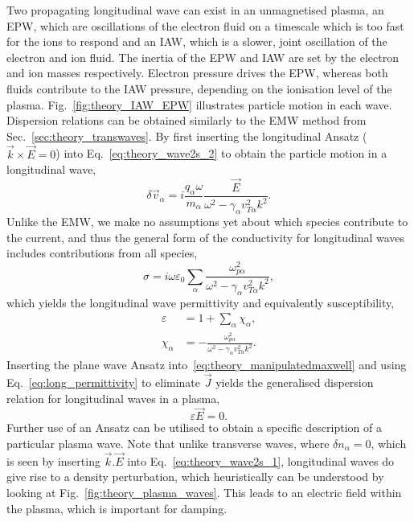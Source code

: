 Two propagating longitudinal wave can exist in an unmagnetised plasma, an \ac{EPW}, which are oscillations of the electron fluid on a timescale which is too fast for the ions to respond and an \ac{IAW}, which is a slower, joint oscillation of the electron and ion fluid.
The inertia of the \ac{EPW} and \ac{IAW} are set by the electron and ion masses respectively.
Electron pressure drives the \ac{EPW}, whereas both fluids contribute to the \ac{IAW} pressure, depending on the ionisation level of the plasma.
Fig.~\ref{fig:theory_IAW_EPW} illustrates particle motion in each wave.
Dispersion relations can be obtained similarly to the \ac{EMW} method from Sec.~\ref{sec:theory_transwaves}.
By first inserting the longitudinal Ansatz ($\vec{k}\times\vec{E}=0$) into Eq.~\ref{eq:theory_wave2s_2} to obtain the particle motion in a longitudinal wave,
\begin{equation}
    \delta \vec{v}_\alpha = i \frac{q_\alpha \omega}{m_\alpha} \frac{\vec{E}}{\omega^2 - \gamma_\alpha v_{T\alpha}^2 k^2}.
\end{equation}
Unlike the \ac{EMW}, we make no assumptions yet about which species contribute to the current, and thus the general form of the conductivity for longitudinal waves includes contributions from all species,
\begin{equation}
    \sigma = i\omega\varepsilon_0 \sum_{\alpha} \frac{\omega_{p\alpha}^2}{\omega^2 - \gamma_\alpha v_{T\alpha}^2 k^2},
\end{equation}
which yields the longitudinal wave permittivity and equivalently susceptibility,
\begin{align}
    \label{eq:long_permittivity}
    \varepsilon &= 1 + \sum_\alpha \chi_\alpha,\\
    \label{eq:long_susceptibility}
    \chi_\alpha  &= - \frac{\omega_{p\alpha}^2}{\omega^2 - \gamma_\alpha v_{T\alpha}^2 k^2}.
\end{align}
Inserting the plane wave Ansatz into~\ref{eq:theory_manipulatedmaxwell} and using Eq.~\ref{eq:long_permittivity} to eliminate $\vec{J}$ yields the generalised dispersion relation for longitudinal waves in a plasma,
\begin{equation}
    \label{eq:long_disp_rel}
    \varepsilon \vec{E} = 0.
\end{equation}
Further use of an Ansatz can be utilised to obtain a specific description of a particular plasma wave.
Note that unlike transverse waves, where $\delta n_\alpha=0$, which is seen by inserting $\vec{k}.\vec{E}$ into Eq.~\ref{eq:theory_wave2s_1}, longitudinal waves do give rise to a density perturbation, which heuristically can be understood by looking at Fig.~\ref{fig:theory_plasma_waves}.
This leads to an electric field within the plasma, which is important for damping.

